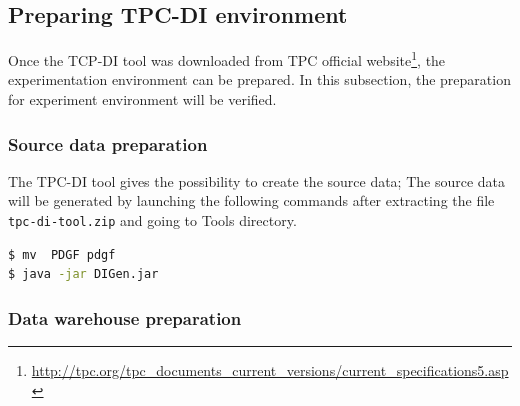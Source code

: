 \documentclass{article}
\newcommand\pcw[1]{\texttt{#1}}
\begin{document}
\subsection{Preparing TPC-DI environment}
Once the TCP-DI tool was downloaded from TPC official website\footnote{\url{http://tpc.org/tpc_documents_current_versions/current_specifications5.asp}}, the experimentation environment can be prepared. In this subsection, the preparation for experiment environment will be verified.

\subsubsection {Source data preparation}

The TPC-DI tool gives the possibility to create the source data; The source data will be generated by launching the following commands after extracting the file \pcw{tpc-di-tool.zip} and going to Tools directory. 
\begin{lstlisting}[language=bash]
$ mv  PDGF pdgf
$ java -jar DIGen.jar
\end{lstlisting}

\subsubsection{Data warehouse preparation}
\end{document}
